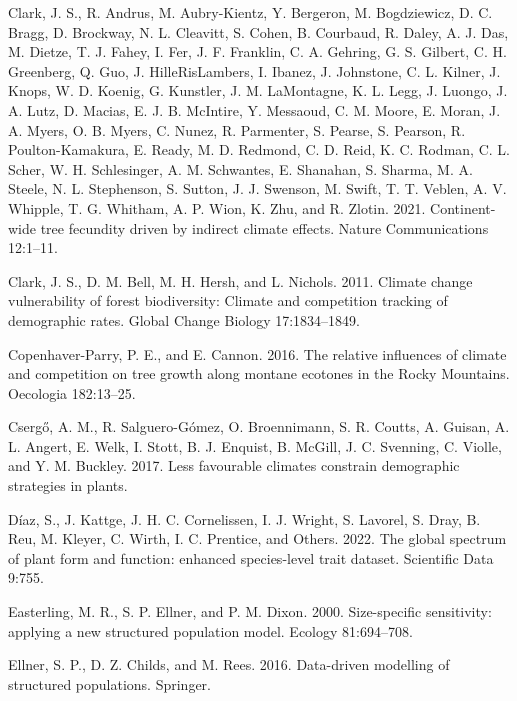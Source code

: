 \documentclass[12pt]{article}
\newlength{\cslhangindent}
\newenvironment{cslreferences}%
  {\setlength{\parindent}{0pt}%
  \everypar{\setlength{\hangindent}{\cslhangindent}}\ignorespaces}%
  {\par}
\begin{document}
\begin{cslreferences}
\leavevmode\hypertarget{ref-Clark2021}{}%
Clark, J. S., R. Andrus, M. Aubry-Kientz, Y. Bergeron, M. Bogdziewicz,
D. C. Bragg, D. Brockway, N. L. Cleavitt, S. Cohen, B. Courbaud, R.
Daley, A. J. Das, M. Dietze, T. J. Fahey, I. Fer, J. F. Franklin, C. A.
Gehring, G. S. Gilbert, C. H. Greenberg, Q. Guo, J. HilleRisLambers, I.
Ibanez, J. Johnstone, C. L. Kilner, J. Knops, W. D. Koenig, G. Kunstler,
J. M. LaMontagne, K. L. Legg, J. Luongo, J. A. Lutz, D. Macias, E. J. B.
McIntire, Y. Messaoud, C. M. Moore, E. Moran, J. A. Myers, O. B. Myers,
C. Nunez, R. Parmenter, S. Pearse, S. Pearson, R. Poulton-Kamakura, E.
Ready, M. D. Redmond, C. D. Reid, K. C. Rodman, C. L. Scher, W. H.
Schlesinger, A. M. Schwantes, E. Shanahan, S. Sharma, M. A. Steele, N.
L. Stephenson, S. Sutton, J. J. Swenson, M. Swift, T. T. Veblen, A. V.
Whipple, T. G. Whitham, A. P. Wion, K. Zhu, and R. Zlotin. 2021.
Continent-wide tree fecundity driven by indirect climate effects. Nature
Communications 12:1--11.

\leavevmode\hypertarget{ref-Clark2011}{}%
Clark, J. S., D. M. Bell, M. H. Hersh, and L. Nichols. 2011. Climate
change vulnerability of forest biodiversity: Climate and competition
tracking of demographic rates. Global Change Biology 17:1834--1849.

\leavevmode\hypertarget{ref-CopenhaverParry2016}{}%
Copenhaver-Parry, P. E., and E. Cannon. 2016. The relative influences of
climate and competition on tree growth along montane ecotones in the
Rocky Mountains. Oecologia 182:13--25.

\leavevmode\hypertarget{ref-Csergo2017}{}%
Csergő, A. M., R. Salguero-Gómez, O. Broennimann, S. R. Coutts, A.
Guisan, A. L. Angert, E. Welk, I. Stott, B. J. Enquist, B. McGill, J. C.
Svenning, C. Violle, and Y. M. Buckley. 2017. Less favourable climates
constrain demographic strategies in plants.

\leavevmode\hypertarget{ref-diaz2022}{}%
Díaz, S., J. Kattge, J. H. C. Cornelissen, I. J. Wright, S. Lavorel, S.
Dray, B. Reu, M. Kleyer, C. Wirth, I. C. Prentice, and Others. 2022. The
global spectrum of plant form and function: enhanced species-level trait
dataset. Scientific Data 9:755.

\leavevmode\hypertarget{ref-Easterling2000}{}%
Easterling, M. R., S. P. Ellner, and P. M. Dixon. 2000. Size-specific
sensitivity: applying a new structured population model. Ecology
81:694--708.

\leavevmode\hypertarget{ref-Ellner2016}{}%
Ellner, S. P., D. Z. Childs, and M. Rees. 2016. Data-driven modelling of
structured populations. Springer.


\end{cslreferences}
\end{document}
